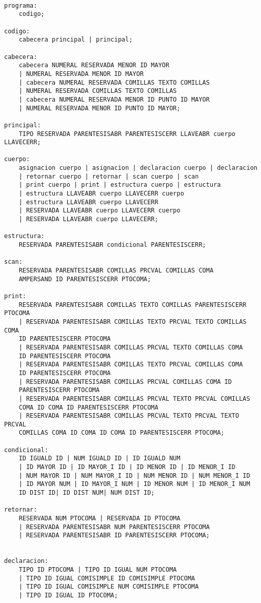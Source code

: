 \documentclass[aspectratio=169]{article}
\begin{document}
\begin{lstlisting}

programa:
	codigo;

codigo:
	cabecera principal | principal;

cabecera:
	cabecera NUMERAL RESERVADA MENOR ID MAYOR
	| NUMERAL RESERVADA MENOR ID MAYOR
	| cabecera NUMERAL RESERVADA COMILLAS TEXTO COMILLAS
	| NUMERAL RESERVADA COMILLAS TEXTO COMILLAS
	| cabecera NUMERAL RESERVADA MENOR ID PUNTO ID MAYOR
	| NUMERAL RESERVADA MENOR ID PUNTO ID MAYOR;

principal:
	TIPO RESERVADA PARENTESISABR PARENTESISCERR LLAVEABR cuerpo LLAVECERR;

cuerpo:
	asignacion cuerpo | asignacion | declaracion cuerpo | declaracion
	| retornar cuerpo | retornar | scan cuerpo | scan
	| print cuerpo | print | estructura cuerpo | estructura
	| estructura LLAVEABR cuerpo LLAVECERR cuerpo
	| estructura LLAVEABR cuerpo LLAVECERR
	| RESERVADA LLAVEABR cuerpo LLAVECERR cuerpo
	| RESERVADA LLAVEABR cuerpo LLAVECERR;

estructura:
	RESERVADA PARENTESISABR condicional PARENTESISCERR;

scan:
	RESERVADA PARENTESISABR COMILLAS PRCVAL COMILLAS COMA
	AMPERSAND ID PARENTESISCERR PTOCOMA;

print:
	RESERVADA PARENTESISABR COMILLAS TEXTO COMILLAS PARENTESISCERR PTOCOMA
	| RESERVADA PARENTESISABR COMILLAS TEXTO PRCVAL TEXTO COMILLAS COMA
	ID PARENTESISCERR PTOCOMA
	| RESERVADA PARENTESISABR COMILLAS PRCVAL TEXTO COMILLAS COMA
	ID PARENTESISCERR PTOCOMA
	| RESERVADA PARENTESISABR COMILLAS TEXTO PRCVAL COMILLAS COMA
	ID PARENTESISCERR PTOCOMA
	| RESERVADA PARENTESISABR COMILLAS PRCVAL COMILLAS COMA ID
	PARENTESISCERR PTOCOMA
	| RESERVADA PARENTESISABR COMILLAS PRCVAL TEXTO PRCVAL COMILLAS
	COMA ID COMA ID PARENTESISCERR PTOCOMA
	| RESERVADA PARENTESISABR COMILLAS PRCVAL TEXTO PRCVAL TEXTO PRCVAL
	COMILLAS COMA ID COMA ID COMA ID PARENTESISCERR PTOCOMA;

condicional:
	ID IGUALD ID | NUM IGUALD ID | ID IGUALD NUM
	| ID MAYOR ID | ID MAYOR_I ID | ID MENOR ID | ID MENOR_I ID
	| NUM MAYOR ID | NUM MAYOR_I ID | NUM MENOR ID | NUM MENOR_I ID
	| ID MAYOR NUM | ID MAYOR_I NUM | ID MENOR NUM | ID MENOR_I NUM
	ID DIST ID| ID DIST NUM| NUM DIST ID;

retornar:
	RESERVADA NUM PTOCOMA | RESERVADA ID PTOCOMA
	| RESERVADA PARENTESISABR NUM PARENTESISCERR PTOCOMA
	| RESERVADA PARENTESISABR ID PARENTESISCERR PTOCOMA;


declaracion:
	TIPO ID PTOCOMA | TIPO ID IGUAL NUM PTOCOMA
	| TIPO ID IGUAL COMISIMPLE ID COMISIMPLE PTOCOMA
	| TIPO ID IGUAL COMISIMPLE NUM COMISIMPLE PTOCOMA
	| TIPO ID IGUAL ID PTOCOMA;


\end{lstlisting}
\end{document}
